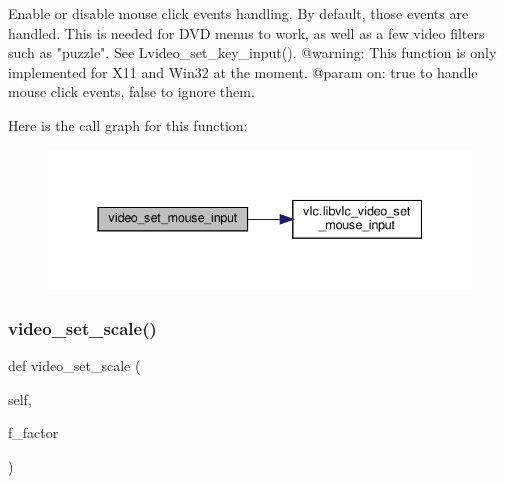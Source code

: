 \begin{DoxyVerb}Enable or disable mouse click events handling. By default, those events are
handled. This is needed for DVD menus to work, as well as a few video
filters such as "puzzle".
See L{video_set_key_input}().
@warning: This function is only implemented for X11 and Win32 at the moment.
@param on: true to handle mouse click events, false to ignore them.
\end{DoxyVerb}
 Here is the call graph for this function\+:
\nopagebreak
\begin{figure}[H]
\begin{center}
\leavevmode
\includegraphics[width=337pt]{classvlc_1_1_media_player_a7f6d6677a1da3c8af7bdb6b4e030a857_cgraph}
\end{center}
\end{figure}
\mbox{\label{classvlc_1_1_media_player_a7a94d14801fa927f859c65e0af3cbe4f}} 
\subsubsection{\texorpdfstring{video\+\_\+set\+\_\+scale()}{video\_set\_scale()}}
{\footnotesize\ttfamily def video\+\_\+set\+\_\+scale (\begin{DoxyParamCaption}\item[{}]{self,  }\item[{}]{f\+\_\+factor }\end{DoxyParamCaption})}

